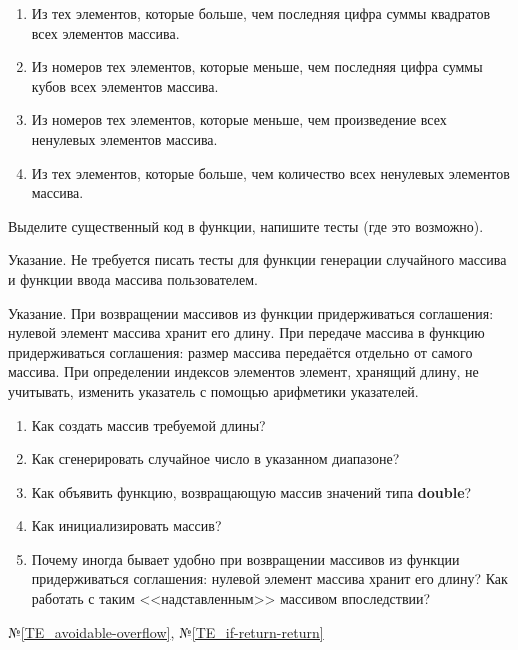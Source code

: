 \begin{enumerate}
	\item
		Из тех элементов, которые больше, чем последняя цифра суммы квадратов всех элементов массива.

	\item
		Из номеров тех элементов, которые меньше, чем последняя цифра суммы кубов всех элементов массива.

	\item
		Из номеров тех элементов, которые меньше, чем произведение всех ненулевых элементов массива.

	\item
		Из тех элементов, которые больше, чем количество всех ненулевых элементов массива.

\end{enumerate}


\labtask

Выделите существенный код в функции, напишите тесты (где это возможно).

Указание. Не требуется писать тесты для функции генерации случайного массива и функции ввода массива пользователем. 

Указание. При возвращении массивов из функции придерживаться соглашения: нулевой элемент массива хранит его длину.
При передаче массива в функцию придерживаться соглашения: размер массива передаётся отдельно от самого массива.
При определении индексов элементов элемент, хранящий длину, не учитывать, изменить указатель с помощью арифметики указателей.

\labworkquestions

\begin{enumerate}

	\item
		Как создать массив требуемой длины?
	\item
		Как сгенерировать случайное число в указанном диапазоне?
	\item
		Как объявить функцию, возвращающую массив значений типа \textbf{double}?
	\item
		Как инициализировать массив?
	\item
		Почему иногда бывает удобно при возвращении массивов из функции придерживаться соглашения: нулевой элемент массива хранит его длину?
		Как работать с таким <<надставленным>> массивом впоследствии?
\end{enumerate}

\typerrors
№\ref{TE_avoidable-overflow},
№\ref{TE_if-return-return}

